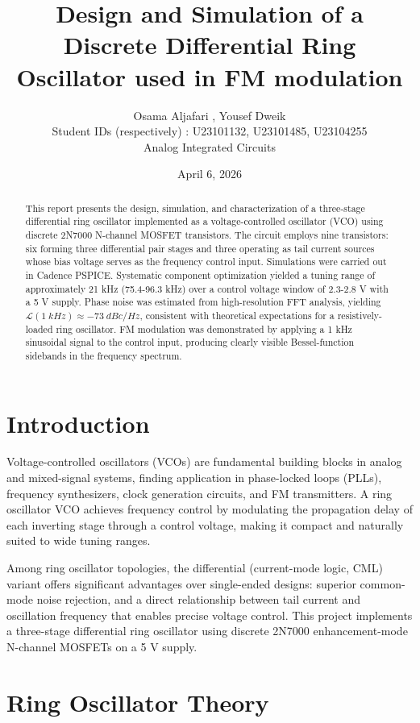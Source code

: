 \documentclass[11pt]{article}
\title{Design and Simulation of a Discrete Differential Ring Oscillator used in FM modulation}
\author{Osama Aljafari , Yousef Dweik\\ Student IDs (respectively) : U23101132, U23101485, U23104255  \\ Analog Integrated Circuits}
\date{April 6, 2026}
\begin{document}
\maketitle

\begin{abstract}
This report presents the design, simulation, and characterization of a three-stage differential ring oscillator implemented as a voltage-controlled oscillator (VCO) using discrete 2N7000 N-channel MOSFET transistors. The circuit employs nine transistors: six forming three differential pair stages and three operating as tail current sources whose bias voltage serves as the frequency control input. Simulations were carried out in Cadence PSPICE. Systematic component optimization yielded a tuning range of approximately 21 kHz (75.4-96.3 kHz) over a control voltage window of 2.3-2.8 V with a 5 V supply. Phase noise was estimated from high-resolution FFT analysis, yielding $\mathcal{L}(1~kHz)\approx-73~dBc/Hz$, consistent with theoretical expectations for a resistively-loaded ring oscillator. FM modulation was demonstrated by applying a 1 kHz sinusoidal signal to the control input, producing clearly visible Bessel-function sidebands in the frequency spectrum.
\end{abstract}

\newpage
\tableofcontents
\newpage

\section{Introduction}
Voltage-controlled oscillators (VCOs) are fundamental building blocks in analog and mixed-signal systems, finding application in phase-locked loops (PLLs), frequency synthesizers, clock generation circuits, and FM transmitters. A ring oscillator VCO achieves frequency control by modulating the propagation delay of each inverting stage through a control voltage, making it compact and naturally suited to wide tuning ranges.

Among ring oscillator topologies, the differential (current-mode logic, CML) variant offers significant advantages over single-ended designs: superior common-mode noise rejection, and a direct relationship between tail current and oscillation frequency that enables precise voltage control. This project implements a three-stage differential ring oscillator using discrete 2N7000 enhancement-mode N-channel MOSFETs on a 5 V supply.

\section{Ring Oscillator Theory}
\end{document}
